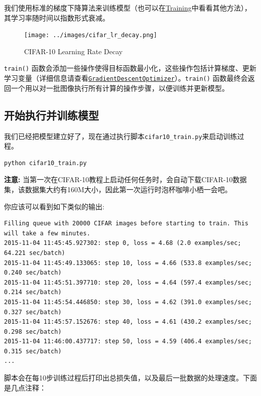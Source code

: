 我们使用标准的梯度下降算法来训练模型（也可以在\href{https://github.com/jikexueyuanwiki/tensorflow-zh/blob/master/SOURCE/api_docs/python/train.md}{Training}中看看其他方法），其学习率随时间以指数形式衰减。

\begin{figure}[htbp]
\centering
\texttt{[image: ../images/cifar\_lr\_decay.png]}
\caption{CIFAR-10 Learning Rate Decay}
\end{figure}

\texttt{train()}
函数会添加一些操作使得目标函数最小化，这些操作包括计算梯度、更新学习变量（详细信息请查看\href{tensorflow-zh/SOURCE/api_docs/python/train.md\#GradientDescentOptimizer}{\texttt{GradientDescentOptimizer}}）。\texttt{train()}
函数最终会返回一个用以对一批图像执行所有计算的操作步骤，以便训练并更新模型。

\subsection{开始执行并训练模型
}\label{ux5f00ux59cbux6267ux884cux5e76ux8badux7ec3ux6a21ux578b}

我们已经把模型建立好了，现在通过执行脚本\texttt{cifar10\_train.py}来启动训练过程。

\begin{verbatim}
python cifar10_train.py
\end{verbatim}

\textbf{注意:}
当第一次在CIFAR-10教程上启动任何任务时，会自动下载CIFAR-10数据集，该数据集大约有160M大小，因此第一次运行时泡杯咖啡小栖一会吧。

你应该可以看到如下类似的输出:

\begin{verbatim}
Filling queue with 20000 CIFAR images before starting to train. This will take a few minutes.
2015-11-04 11:45:45.927302: step 0, loss = 4.68 (2.0 examples/sec; 64.221 sec/batch)
2015-11-04 11:45:49.133065: step 10, loss = 4.66 (533.8 examples/sec; 0.240 sec/batch)
2015-11-04 11:45:51.397710: step 20, loss = 4.64 (597.4 examples/sec; 0.214 sec/batch)
2015-11-04 11:45:54.446850: step 30, loss = 4.62 (391.0 examples/sec; 0.327 sec/batch)
2015-11-04 11:45:57.152676: step 40, loss = 4.61 (430.2 examples/sec; 0.298 sec/batch)
2015-11-04 11:46:00.437717: step 50, loss = 4.59 (406.4 examples/sec; 0.315 sec/batch)
...
\end{verbatim}

脚本会在每10步训练过程后打印出总损失值，以及最后一批数据的处理速度。下面是几点注释：


